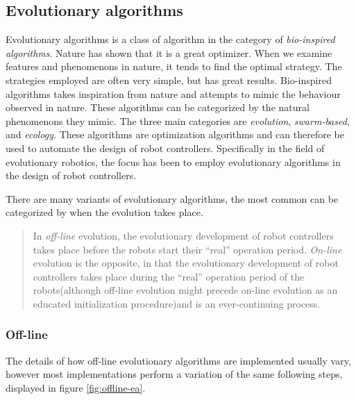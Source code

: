 \subsection{Evolutionary algorithms}
\label{sec:evo_alg}
Evolutionary algorithms is a class of algorithm in the category of \emph{bio-inspired algorithms}\cite{binitha_survey_2012}.
Nature has shown that it is a great optimizer.
When we examine features and phenomenons in nature, it tends to find the optimal strategy.
The strategies employed are often very simple, but has great results.
Bio-inspired algorithms takes inspiration from nature and attempts to mimic the behaviour observed in nature.
These algorithms can be categorized by the natural phenomenons they mimic.
The three main categories are \emph{evolution}, \emph{swarm-based}, and \emph{ecology}\cite{binitha_survey_2012}. 
These algorithms are optimization algorithms and can therefore be used to automate the design of robot controllers.
Specifically in the field of evolutionary robotics, the focus has been to employ evolutionary algorithms in the design of robot controllers.


There are many variants of evolutionary algorithms, the most common can be categorized by when the evolution takes place\cite{eiben_embodied_2010}.
\begin{quote} 
	In \emph{off-line} evolution, the evolutionary development of robot controllers takes place before the robots start their “real” operation period.
	\emph{On-line} evolution is the opposite, in that the evolutionary development of robot controllers takes place during the “real” operation period of the robots(although off-line evolution might precede on-line evolution as an educated initialization procedure)and is an ever-continuing process.\cite{eiben_embodied_2010}
\end{quote} 


\subsubsection*{Off-line}
The details of how off-line evolutionary algorithms are implemented usually vary, however most implementations perform a variation of the same following steps\cite{doncieux_evolutionary_2011}, displayed in figure \ref{fig:offline-ea}. 

